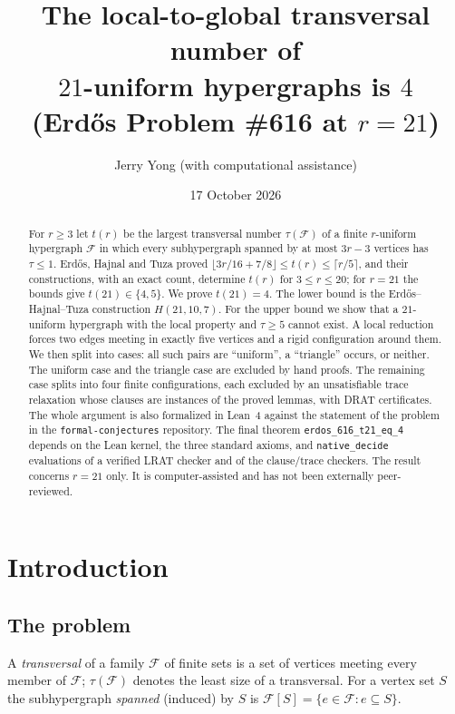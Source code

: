 \documentclass[11pt]{amsart}
\title[$t(21)=4$ for Erd\H{o}s Problem \#616]{The local-to-global transversal number of\\ $21$-uniform hypergraphs is $4$\\ (Erd\H{o}s Problem \#616 at $r=21$)}
\author{Jerry Yong (with computational assistance)}
\date{17 October 2026}
\theoremstyle{definition}
\newcommand{\cF}{\mathcal{F}}
\begin{document}
\begin{abstract}
For $r\ge 3$ let $t(r)$ be the largest transversal number $\tau(\cF)$ of a finite $r$-uniform hypergraph $\cF$ in which every subhypergraph spanned by at most $3r-3$ vertices has $\tau\le 1$. Erd\H{o}s, Hajnal and Tuza proved $\lfloor 3r/16+7/8\rfloor\le t(r)\le\lceil r/5\rceil$, and their constructions, with an exact count, determine $t(r)$ for $3\le r\le 20$; for $r=21$ the bounds give $t(21)\in\{4,5\}$. We prove $t(21)=4$. The lower bound is the Erd\H{o}s--Hajnal--Tuza construction $H(21,10,7)$. For the upper bound we show that a $21$-uniform hypergraph with the local property and $\tau\ge 5$ cannot exist. A local reduction forces two edges meeting in exactly five vertices and a rigid configuration around them. We then split into cases: all such pairs are ``uniform'', a ``triangle'' occurs, or neither. The uniform case and the triangle case are excluded by hand proofs. The remaining case splits into four finite configurations, each excluded by an unsatisfiable trace relaxation whose clauses are instances of the proved lemmas, with DRAT certificates. The whole argument is also formalized in Lean~4 against the statement of the problem in the \texttt{formal-conjectures} repository. The final theorem \texttt{erdos\_616\_t21\_eq\_4} depends on the Lean kernel, the three standard axioms, and \texttt{native\_decide} evaluations of a verified LRAT checker and of the clause/trace checkers. The result concerns $r=21$ only. It is computer-assisted and has not been externally peer-reviewed.
\end{abstract}

\maketitle
\tableofcontents

\section{Introduction}\label{sec:intro}

\subsection{The problem}
A \emph{transversal} of a family $\cF$ of finite sets is a set of vertices meeting every member of $\cF$; $\tau(\cF)$ denotes the least size of a transversal. For a vertex set $S$ the subhypergraph \emph{spanned} (induced) by $S$ is $\cF[S]=\{e\in\cF: e\subseteq S\}$.
\end{document}
